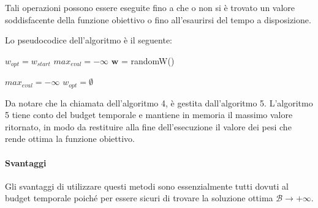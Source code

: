 Tali operazioni possono essere eseguite fino a che o non si è trovato un valore
soddisfacente della funzione obiettivo o fino all'esaurirsi del tempo a disposizione.

\pagebreak

Lo pseudocodice dell'algoritmo è il seguente:
\begin{algorithm}[h!]
	\small
	\DontPrintSemicolon
	\BlankLine

	$w_{opt} = w_{start}$\;
	$max_{eval} = -\infty$\;
	$\boldsymbol{w}$ = randomW()\;
		
	\BlankLine
	
	
	\caption{\textsc{}}
	\label{alg:lsrs}
\end{algorithm}



\begin{algorithm}[h!]
	\small
	\DontPrintSemicolon
	\BlankLine
	
	$max_{eval} = -\infty$\;
	$w_{opt} = \emptyset $\;
	
	\caption{\textsc{}}
	\label{alg:lsrsm}
\end{algorithm}

Da notare che la chiamata dell'algoritmo 4, è gestita
dall'algoritmo 5. L'algoritmo 5 tiene conto del budget temporale e mantiene in memoria
il massimo valore ritornato, in modo da restituire alla fine dell'esecuzione
il valore dei pesi che rende ottima la funzione obiettivo.

\paragraph{Svantaggi}
Gli svantaggi di utilizzare questi metodi sono essenzialmente tutti dovuti al budget temporale
poiché per essere sicuri di trovare la soluzione ottima $\mathcal{B} \to +\infty$.


